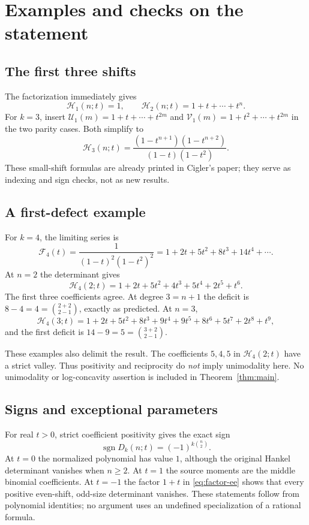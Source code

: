 \documentclass[11pt]{article}
\theoremstyle{definition}
\theoremstyle{remark}
\newcommand{\U}{\mathcal U}
\newcommand{\V}{\mathcal V}
\newcommand{\Ht}{\mathcal H}
\newcommand{\F}{\mathcal F}
\DeclareMathOperator{\sgn}{sgn}
\theoremstyle{definition}
\theoremstyle{plain}
\numberwithin{equation}{section}
\begin{document}
\section{Examples and checks on the statement}
\label{sec:examples}

\subsection{The first three shifts}
The factorization immediately gives
\begin{equation}
 \Ht_1(n;t)=1,\qquad
 \Ht_2(n;t)=1+t+\cdots+t^n.
 \label{eq:k12}
\end{equation}
For $k=3$, insert
$\U_1(m)=1+t+\cdots+t^{2m}$ and
$\V_1(m)=1+t^2+\cdots+t^{2m}$ in the two parity cases. Both simplify to
\begin{equation}
 \Ht_3(n;t)=\frac{(1-t^{n+1})(1-t^{n+2})}{(1-t)(1-t^2)}.
 \label{eq:k3}
\end{equation}
These small-shift formulas are already printed in Cigler's paper; they
serve as indexing and sign checks, not as new results.

\subsection{A first-defect example}
For $k=4$, the limiting series is
\[
 \F_4(t)=\frac1{(1-t)^2(1-t^2)^2}
 =1+2t+5t^2+8t^3+14t^4+\cdots.
\]
At $n=2$ the determinant gives
\[
 \Ht_4(2;t)=1+2t+5t^2+4t^3+5t^4+2t^5+t^6.
\]
The first three coefficients agree. At degree $3=n+1$ the deficit is
$8-4=4=\binom{2+2}{2-1}$, exactly as predicted.
At $n=3$,
\[
 \Ht_4(3;t)=1+2t+5t^2+8t^3+9t^4+9t^5+8t^6+5t^7+2t^8+t^9,
\]
and the first deficit is $14-9=5=\binom{3+2}{2-1}$.

These examples also delimit the result. The coefficients $5,4,5$ in
$\Ht_4(2;t)$ have a strict valley. Thus positivity and reciprocity do
\emph{not} imply unimodality here. No unimodality or log-concavity assertion
is included in Theorem~\ref{thm:main}.

\subsection{Signs and exceptional parameters}
For real $t>0$, strict coefficient positivity gives the exact sign
\begin{equation}
 \sgn D_k(n;t)=(-1)^{k\binom n2}.
 \label{eq:sign}
\end{equation}
At $t=0$ the normalized polynomial has value $1$, although the original
Hankel determinant vanishes when $n\ge2$. At $t=1$ the source moments
are the middle binomial coefficients. At $t=-1$ the factor $1+t$ in
\eqref{eq:factor-ee} shows that every positive even-shift, odd-size determinant
vanishes. These statements follow from polynomial identities; no argument
uses an undefined specialization of a rational formula.
\end{document}
